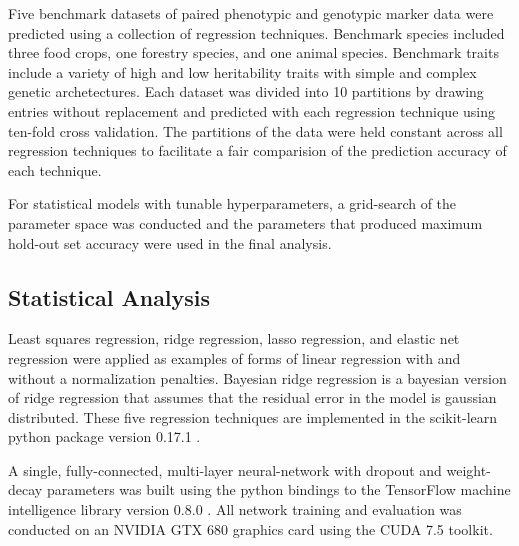 \documentclass[9pt,twocolumn,twoside]{g3_article/gsag3jnl}
\begin{document}
Five benchmark datasets of paired phenotypic and genotypic marker data were predicted 
using a collection of regression techniques. Benchmark species included three food crops, 
one forestry species, and one animal species. Benchmark traits include a variety of high and low
heritability traits with simple and complex genetic archetectures. Each dataset was divided
into 10 partitions by drawing entries without replacement and predicted with each
regression technique using ten-fold cross validation. The partitions of the data were 
held constant across all regression techniques to facilitate a fair comparision of the
prediction accuracy of each technique.

For statistical models with tunable hyperparameters, a grid-search of the parameter 
space was conducted and the parameters that produced maximum hold-out set accuracy 
were used in the final analysis. 


\subsection*{Statistical Analysis} 

Least squares regression, ridge regression, lasso regression, and elastic net regression were applied as examples of
forms of linear regression with and without a normalization penalties. Bayesian ridge regression is a bayesian
version of ridge regression that assumes that the residual error in the model is gaussian distributed. These
five regression techniques are implemented in the scikit-learn python package version 0.17.1 \citep{scikit-learn}.

A single, fully-connected, multi-layer neural-network with dropout and weight-decay parameters was built using 
the python bindings to the TensorFlow machine intelligence library version 0.8.0 \citep{tensorflow2015}. All network training
and evaluation was conducted on an NVIDIA GTX 680 graphics card using the CUDA 7.5 toolkit. 
\end{document}
